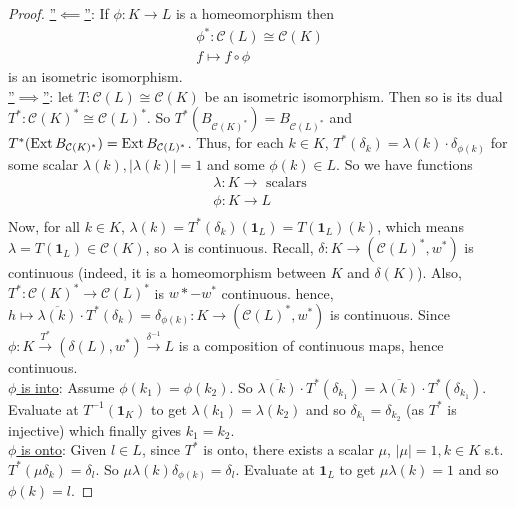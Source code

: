 \documentclass{article}
\begin{document}
\begin{proof}
    \noindent\underline{''$\impliedby$''}: If $\phi:K\to L$ is a homeomorphism then 
    $$
    \begin{array}{cc}
        \phi^*:\mathcal{C}(L)\cong \mathcal{C}(K)\\
        f\mapsto f\circ\phi 
    \end{array}
    $$
    is an isometric isomorphism.\\

    \noindent\underline{''$\implies$''}: let $T:\mathcal{C}(L)\cong \mathcal{C}(K)$ be an isometric isomorphism. Then so is its dual $T^*:\mathcal{C}(K)^*\cong \mathcal{C}(L)^*$. So $T^*(B_{\mathcal{C}(K)^*}) = B_{\mathcal{C}(L)^*}$ and $T^*(\operatorname{Ext} B_{\mathcal{C}(K)^*}) = \operatorname{Ext} B_{\mathcal{C}(L)^*}$. Thus, for each $k\in K$, $T^*(\delta_k) = \lambda(k)\cdot \delta_{\phi(k)}$ for some scalar $\lambda(k), |\lambda(k)|=1$ and some $\phi(k)\in L$. So we have functions 
    $$
    \begin{array}{cc}
        \lambda:K\to \text{ scalars}\\
        \phi:K\to L\\
    \end{array}
    $$
    Now, for all $k\in K$, $\lambda(k)=T^*(\delta_k)(\mathbf{1}_L)=T(\mathbf{1}_L)(k)$, which means $\lambda = T(\mathbf{1}_L)\in \mathcal{C}(K)$, so $\lambda$ is continuous. Recall, $\delta: K\to (\mathcal{C}(L)^*, w^*)$ is continuous (indeed, it is a homeomorphism between $K$ and $\delta(K)$). Also, $T^*:\mathcal{C}(K)^*\to \mathcal{C}(L)^*$ is $w*-w^*$ continuous. hence, $h\mapsto \overline{\lambda(k)}\cdot T^*(\delta_k)=\delta_{\phi(k)}:K\to (\mathcal{C}(L)^*, w^*)$ is continuous. Since $\phi: K\xrightarrow{T^*} (\delta(L), w^*)\xrightarrow{\delta^{-1}}L$ is  a composition of continuous maps, hence continuous.\\
    
    \noindent\underline{$\phi$ is into}: Assume $\phi(k_1)=\phi(k_2)$. So $\overline{\lambda(k)}\cdot T^*(\delta_{k_1}) = \overline{\lambda(k)}\cdot T^*(\delta_{k_1})$. Evaluate at $T^{-1}(\mathbf{1}_K)$ to get $\lambda(k_1)=\lambda(k_2)$ and so $\delta_{k_1} = \delta_{k_2}$ (as $T^*$ is injective) which finally gives $k_1 = k_2$.\\

    \noindent \noindent\underline{$\phi$ is onto}: Given $l\in L$, since $T^*$ is onto, there exists a scalar $\mu$, $|\mu|=1, k\in K$ s.t. $T^*(\mu\delta_k)=\delta_l$. So $\mu\lambda(k)\delta_{\phi(k)}=\delta_l$. Evaluate at $\mathbf{1}_L$ to get $\mu\lambda(k) = 1$ and so $\phi(k)=l$.
\end{proof}
\end{document}

